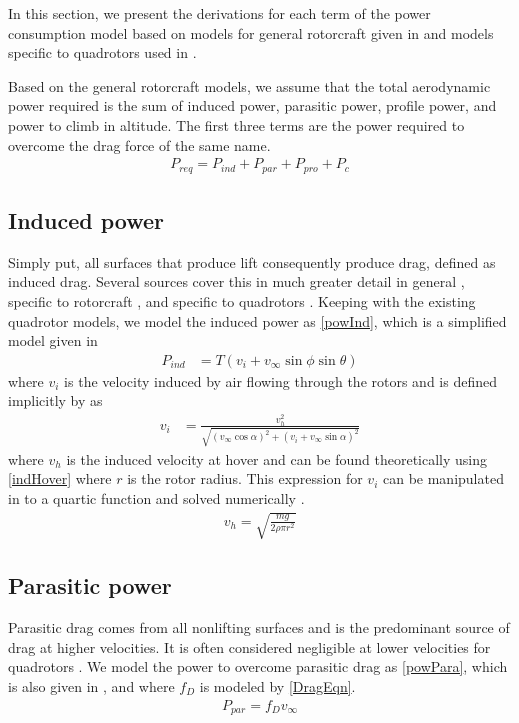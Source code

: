 
In this section, we present the derivations for each term of the power consumption model based on models for general rotorcraft given in \cite{leishman2006principles} and models specific to quadrotors used in \cite{ware2016analysis,kreciglowa2017energy,tagliabue2019model,liu2017power}. 

Based on the general rotorcraft models, we assume that the total aerodynamic power required is the sum of induced power, parasitic power, profile power, and power to climb in altitude. The first three terms are the power required to overcome the drag force of the same name.
\begin{align}
	\label{powReq}
	P_{req} = P_{ind} + P_{par} + P_{pro} + P_c
\end{align}

\subsection{Induced power}
Simply put, all surfaces that produce lift consequently produce drag, defined as induced drag. Several sources cover this in much greater detail in general \cite{anderson2005introduction}, specific to rotorcraft \cite{leishman2006principles}, and specific to quadrotors \cite{bangura2012nonlinear}. Keeping with the existing quadrotor models, we model the induced power as \eqref{powInd}, which is a simplified model given in \cite{leishman2006principles}
\begin{align}
    \label{powInd}
    P_{ind} &= T \left(v_i + v_\infty \sin{\phi} \sin{\theta}\right)
\end{align}
where $v_i$ is the velocity induced by air flowing through the rotors and is defined implicitly by \cite{leishman2006principles} as
\begin{align}
    v_i &= \frac{v_h^2}{\sqrt{\left(v_\infty \cos{\alpha} \right)^2 + \left(v_i + v_\infty \sin{\alpha} \right)^2}}
\end{align}
where $v_h$ is the induced velocity at hover and can be found theoretically using \eqref{indHover} where $r$ is the rotor radius. This expression for $v_i$ can be manipulated in to a quartic function and solved numerically \cite{hoffmann2007quadrotor}.
\begin{align}
	\label{indHover}
	v_h = \sqrt{\frac{mg}{2 \rho \pi r^2}}
\end{align}

\subsection{Parasitic power}
Parasitic drag comes from all nonlifting surfaces and is the predominant source of drag at higher velocities. It is often considered negligible at lower velocities for quadrotors \cite{bangura2012nonlinear}. We model the power to overcome parasitic drag as \eqref{powPara}, which is also given in \cite{leishman2006principles}, and where $f_D$ is modeled by \eqref{DragEqn}.
\begin{align}
	\label{powPara}
	P_{par} = f_D v_\infty 
\end{align}

